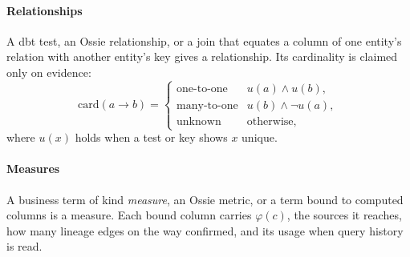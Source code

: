 \paragraph{Relationships} A dbt  test, an Ossie relationship, or a join that
equates a column of one entity's relation with another entity's key gives a relationship. Its
cardinality is claimed only on evidence:
\begin{equation}
  \mathrm{card}(a \to b) =
  \begin{cases}
    \text{one-to-one} & u(a) \wedge u(b),\\
    \text{many-to-one} & u(b) \wedge \neg u(a),\\
    \text{unknown} & \text{otherwise},
  \end{cases}
\end{equation}
where $u(x)$ holds when a test or key shows $x$ unique.

\paragraph{Measures} A business term of kind \emph{measure}, an Ossie metric, or a term bound to
computed columns is a measure. Each bound column carries $\varphi(c)$, the sources it reaches,
how many lineage edges on the way  confirmed, and its usage when query history is read.

